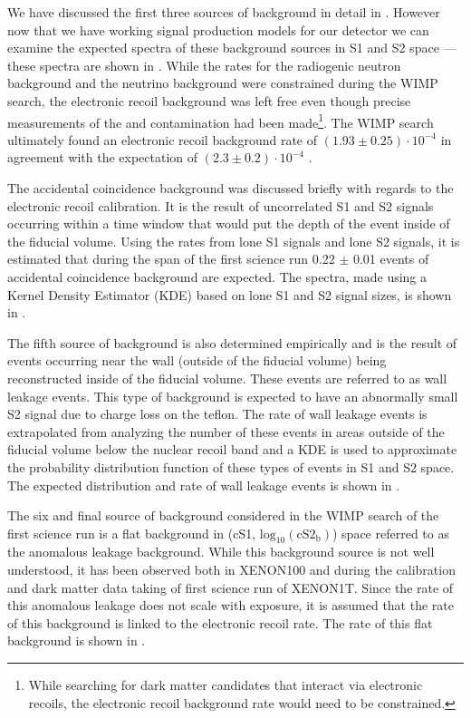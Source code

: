 We have discussed the first three sources of background in detail in .  However now that we have working signal production models for our detector we can examine the expected spectra of these background sources in S1 and S2 space --- these spectra are shown in .  While the rates for the radiogenic neutron background and the neutrino background were constrained during the WIMP search, the electronic recoil background was left free even though precise measurements of the \krypton{} and \radon{} contamination had been made\footnote{While searching for dark matter candidates that interact via electronic recoils, the electronic recoil background rate would need to be constrained.}.  The WIMP search ultimately found an electronic recoil background rate of $(1.93 \pm 0.25) \cdot 10^{-4}$ \dru{} in agreement with the expectation of $(2.3 \pm 0.2) \cdot 10^{-4}$ \dru{} \cite{aprile2017first}.

The accidental coincidence background was discussed briefly with regards to the electronic recoil calibration.  It is the result of uncorrelated S1 and S2 signals occurring within a time window that would put the depth of the event inside of the fiducial volume.    Using the rates from lone S1 signals and lone S2 signals, it is estimated that during the span of the first science run 0.22 $\pm$ 0.01 events of accidental coincidence background are expected.  The spectra, made using a Kernel Density Estimator (KDE) based on lone S1 and S2 signal sizes, is shown in .

The fifth source of background is also determined empirically and is the result of events occurring near the wall (outside of the fiducial volume) being reconstructed inside of the fiducial volume.  These events are referred to as wall leakage events.  This type of background is expected to have an abnormally small S2 signal due to charge loss on the teflon.  The rate of wall leakage events is extrapolated from analyzing the number of these events in areas outside of the fiducial volume below the nuclear recoil band and a KDE is used to approximate the probability distribution function of these types of events in S1 and S2 space.  The expected distribution and rate of wall leakage events is shown in .

The six and final source of background considered in the WIMP search of the first science run is a flat background in (cS1, $\textrm{log}_{10}(\textrm{cS2}_\textrm{b})$) space referred to as the anomalous leakage background.  While this background source is not well understood, it has been observed both in XENON100 \cite{aprile2016xenon100} and during the  calibration and dark matter data taking of first science run of XENON1T.  Since the rate of this anomalous leakage does not scale with exposure, it is assumed that the rate of this background is linked to the electronic recoil rate.  The rate of this flat background is shown in .

